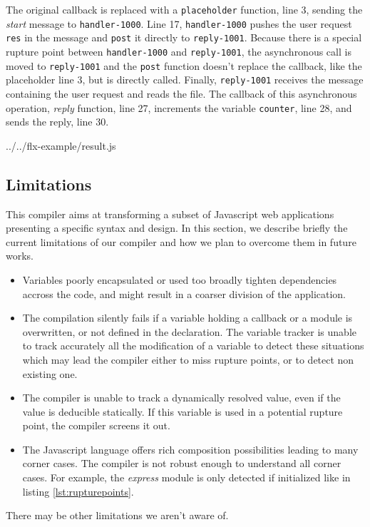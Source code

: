 The original callback is replaced with a \texttt{placeholder} function, line 3, sending the \textit{start} message to \texttt{handler-1000}.
Line 17, \texttt{handler-1000} pushes the user request \texttt{res} in the message and \texttt{post} it directly to \texttt{reply-1001}.
Because there is a special rupture point between \texttt{handler-1000} and \texttt{reply-1001}, the asynchronous call is moved to \texttt{reply-1001} and the \texttt{post} function doesn't replace the callback, like the placeholder line 3, but is directly called.
Finally, \texttt{reply-1001} receives the message containing the user request and reads the file.
The callback of this asynchronous operation, \textit{reply} function, line 27, increments the variable \texttt{counter}, line 28, and sends the reply, line 30.

{../../flx-example/result.js}

\subsection{Limitations}

This compiler aims at transforming a subset of Javascript web applications presenting a specific syntax and design.
In this section, we describe briefly the current limitations of our compiler and how we plan to overcome them in future works.

\begin{itemize}
  \item Variables poorly encapsulated or used too broadly tighten dependencies accross the code, and might result in a coarser division of the application.
  \item The compilation silently fails if a variable holding a callback or a module is overwritten, or not defined in the declaration.
        The variable tracker is unable to track accurately all the modification of a variable to detect these situations which may lead the compiler either to miss rupture points, or to detect non existing one.
  \item The compiler is unable to track a dynamically resolved value, even if the value is deducible statically.
        If this variable is used in a potential rupture point, the compiler screens it out.
  \item The Javascript language offers rich composition possibilities leading to many corner cases.
        The compiler is not robust enough to understand all corner cases.
        For example, the \textit{express} module is only detected if initialized like in listing \ref{lst:rupturepoints}.
\end{itemize}
There may be other limitations we aren't aware of.

